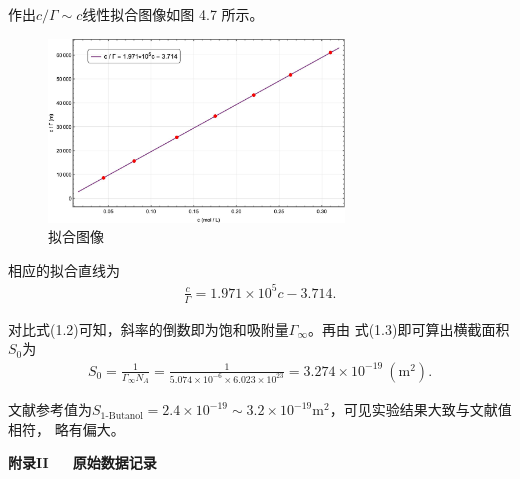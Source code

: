\documentclass[12pt]{ctexart}
\numberwithin{equation}{section}
\begin{document}
作出$c/\Gamma \sim c$线性拟合图像如图 4.7 所示。

\begin{figure}[ht]
    \centering
    \includegraphics[width=0.7\textwidth]{fitting_gamma.jpeg}
    \caption{拟合图像}
\end{figure}

相应的拟合直线为
\begin{align}
    \frac{c}{\Gamma} = 1.971\times 10^5 c - 3.714.
    \tag{I.5}
\end{align}

对比式(1.2)可知，斜率的倒数即为饱和吸附量$\Gamma_\infty$。再由
式(1.3)即可算出横截面积$S_0$为
\begin{align}
    S_0 = \frac{1}{\Gamma_\infty N_A}
    = \frac{1}{5.074\times 10^{-6}\times 6.023\times 10^{23}}
    = 3.274\times 10^{-19}~(\mathrm{m^2}).
    \tag{I.6}
\end{align}

文献参考值为$S_{\text{1-Butanol}} = 2.4\times 10^{-19}\sim
3.2\times 10^{-19}\mathrm{m^2}$，可见实验结果大致与文献值相符，
略有偏大。
\pagebreak
\begin{center}
    \Large\bfseries{附录II~~~原始数据记录}
\end{center}
\end{document}
